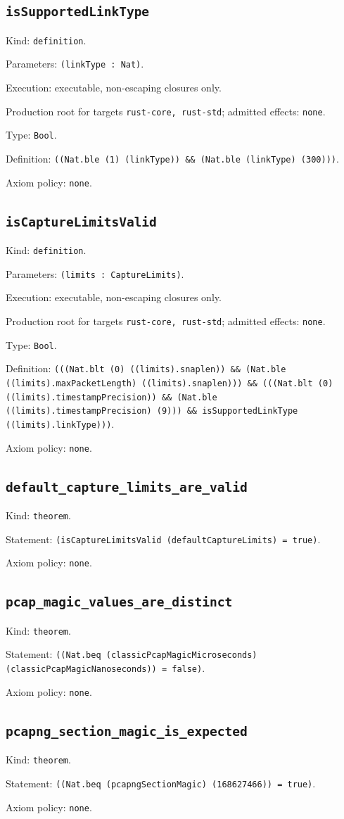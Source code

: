 \documentclass[11pt]{article}
\begin{document}
\subsection*{\texttt{isSupportedLinkType}}
\noindent Kind: \texttt{definition}.\par
\noindent Parameters: \texttt{(linkType : Nat)}.\par
\noindent Execution: executable, non-escaping closures only.\par
\noindent Production root for targets \texttt{rust-core, rust-std}; admitted effects: \texttt{none}.\par
\noindent Type: \texttt{Bool}.\par
\noindent Definition: \texttt{((Nat.ble (1) (linkType)) \&\& (Nat.ble (linkType) (300)))}.\par
\noindent Axiom policy: \texttt{none}.\par
\subsection*{\texttt{isCaptureLimitsValid}}
\noindent Kind: \texttt{definition}.\par
\noindent Parameters: \texttt{(limits : CaptureLimits)}.\par
\noindent Execution: executable, non-escaping closures only.\par
\noindent Production root for targets \texttt{rust-core, rust-std}; admitted effects: \texttt{none}.\par
\noindent Type: \texttt{Bool}.\par
\noindent Definition: \texttt{(((Nat.blt (0) ((limits).snaplen)) \&\& (Nat.ble ((limits).maxPacketLength) ((limits).snaplen))) \&\& (((Nat.blt (0) ((limits).timestampPrecision)) \&\& (Nat.ble ((limits).timestampPrecision) (9))) \&\& isSupportedLinkType ((limits).linkType)))}.\par
\noindent Axiom policy: \texttt{none}.\par
\subsection*{\texttt{default\_capture\_limits\_are\_valid}}
\noindent Kind: \texttt{theorem}.\par
\noindent Statement: \texttt{(isCaptureLimitsValid (defaultCaptureLimits) = true)}.\par
\noindent Axiom policy: \texttt{none}.\par
\subsection*{\texttt{pcap\_magic\_values\_are\_distinct}}
\noindent Kind: \texttt{theorem}.\par
\noindent Statement: \texttt{((Nat.beq (classicPcapMagicMicroseconds) (classicPcapMagicNanoseconds)) = false)}.\par
\noindent Axiom policy: \texttt{none}.\par
\subsection*{\texttt{pcapng\_section\_magic\_is\_expected}}
\noindent Kind: \texttt{theorem}.\par
\noindent Statement: \texttt{((Nat.beq (pcapngSectionMagic) (168627466)) = true)}.\par
\noindent Axiom policy: \texttt{none}.\par
\end{document}

